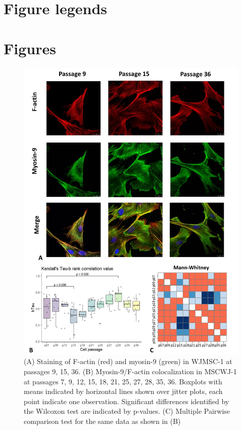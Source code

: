 \documentclass[alpha-refs]{wiley-article}
\begin{document}
\section*{Figure legends}


\section*{Figures}


\begin{figure}[hbt!]
\centering
\includegraphics[width=0.9\linewidth]{myosin-9.jpg}
\caption{(A) Staining of F-actin (red) and myosin-9 (green) in WJMSC-1 at passages 9, 15, 36.
(B) Myosin-9/F-actin colocalization in MSCWJ-1 at passages 7, 9, 12, 15, 18, 21, 25, 27, 28, 35, 36. Boxplots with means indicated by horizontal lines shown over jitter plots, each point indicate one observation. Significant differences identified by the Wilcoxon test are indicated by p-values. (C) Multiple Pairwise comparison test for the same data as shown in (B)}
\end{figure}
\end{document}
